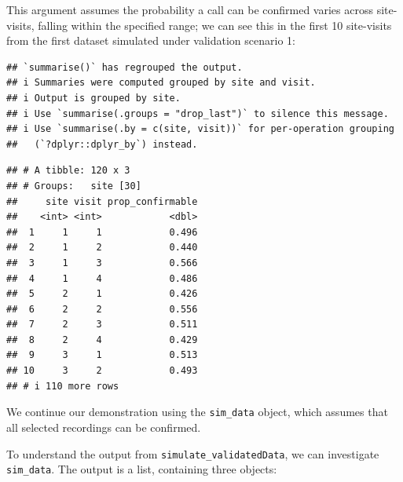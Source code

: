 \documentclass[
]{article}
\newenvironment{Shaded}{\begin{snugshade}}{\end{snugshade}}
\newcommand{\AttributeTok}[1]{\textcolor[rgb]{0.13,0.29,0.53}{#1}}
\newcommand{\CommentTok}[1]{\textcolor[rgb]{0.56,0.35,0.01}{\textit{#1}}}
\newcommand{\DecValTok}[1]{\textcolor[rgb]{0.00,0.00,0.81}{#1}}
\newcommand{\FunctionTok}[1]{\textcolor[rgb]{0.13,0.29,0.53}{\textbf{#1}}}
\newcommand{\NormalTok}[1]{#1}
\newcommand{\SpecialCharTok}[1]{\textcolor[rgb]{0.81,0.36,0.00}{\textbf{#1}}}
\begin{document}
This argument assumes the probability a call can be confirmed varies across site-visits, falling within the specified range; we can see this in the first 10 site-visits from the first dataset simulated under validation scenario 1:

\linespread{1}

\begin{Shaded}
\end{Shaded}

\begin{verbatim}
## `summarise()` has regrouped the output.
## i Summaries were computed grouped by site and visit.
## i Output is grouped by site.
## i Use `summarise(.groups = "drop_last")` to silence this message.
## i Use `summarise(.by = c(site, visit))` for per-operation grouping
##   (`?dplyr::dplyr_by`) instead.
\end{verbatim}

\begin{verbatim}
## # A tibble: 120 x 3
## # Groups:   site [30]
##     site visit prop_confirmable
##    <int> <int>            <dbl>
##  1     1     1            0.496
##  2     1     2            0.440
##  3     1     3            0.566
##  4     1     4            0.486
##  5     2     1            0.426
##  6     2     2            0.556
##  7     2     3            0.511
##  8     2     4            0.429
##  9     3     1            0.513
## 10     3     2            0.493
## # i 110 more rows
\end{verbatim}

\linespread{1}

We continue our demonstration using the \texttt{sim\_data} object, which assumes that all selected recordings can be confirmed.

To understand the output from \texttt{simulate\_validatedData}, we can investigate \texttt{sim\_data}. The output is a list, containing three objects:
\end{document}
